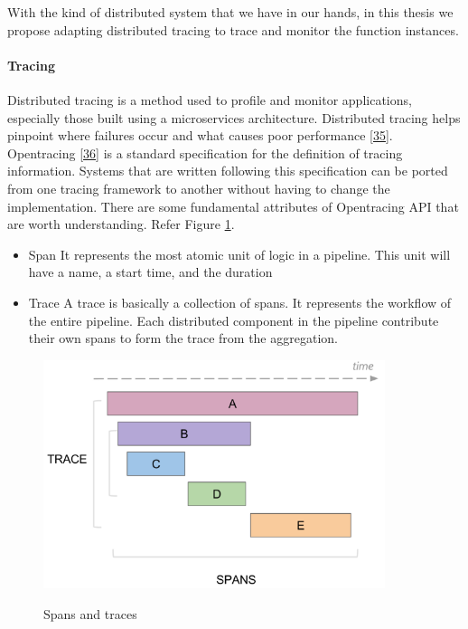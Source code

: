 \documentclass[12pt,titlepage]{article}
\begin{document}
With the kind of distributed system that we have in our hands, in this thesis we
propose adapting distributed tracing to trace and monitor the
function instances.

\paragraph{Tracing}
\label{sec:org76a7935}
Distributed tracing is a method used to profile and monitor applications,
especially those built using a microservices architecture. Distributed tracing
helps pinpoint where failures occur and what causes poor performance \hyperref[ref:35]{[35}].
Opentracing \hyperref[ref:36]{[36}] is a standard specification for the definition of tracing
information. Systems that are written following this specification can be ported
from one tracing framework to another without having to change the
implementation. There are some fundamental attributes of Opentracing API that
are worth understanding. Refer Figure \ref{fig:traces}.
\begin{itemize}
\item Span
It represents the most atomic unit of logic in a pipeline. This unit will have
a name, a start time, and the duration
\item Trace
A trace is basically a collection of spans. It represents the workflow of the
entire pipeline. Each distributed component in the pipeline contribute their
own spans to form the trace from the aggregation.
\end{itemize}

\begin{figure}[!h]
    \caption{Spans and traces}
    \centering
    \includegraphics[width=100mm]{./thesis_images/traces.png}
    \label{fig:traces}
\end{figure}
\end{document}
